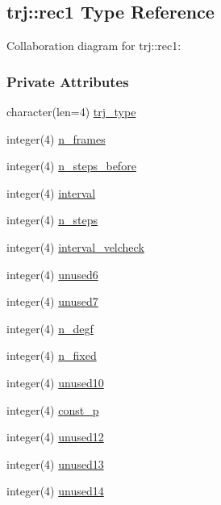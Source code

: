 \hypertarget{structtrj_1_1rec1}{\subsection{trj\-:\-:rec1 Type Reference}
\label{structtrj_1_1rec1}
}


Collaboration diagram for trj\-:\-:rec1\-:
\subsubsection*{Private Attributes}
\begin{DoxyCompactItemize}
\item 
character(len=4) \hyperlink{structtrj_1_1rec1_a862716d57b11724e2788f49a846f833f}{trj\-\_\-type}
\item 
integer(4) \hyperlink{structtrj_1_1rec1_a3cd09d77ed226e1ed2665dfb2e137c73}{n\-\_\-frames}
\item 
integer(4) \hyperlink{structtrj_1_1rec1_aeccf6f19e0a835924d5d927a35ac582d}{n\-\_\-steps\-\_\-before}
\item 
integer(4) \hyperlink{structtrj_1_1rec1_ae49a5622a7b1b8315421e211b128c6d2}{interval}
\item 
integer(4) \hyperlink{structtrj_1_1rec1_a2fb6023c1c0adbc2543bee4ed2fe222c}{n\-\_\-steps}
\item 
integer(4) \hyperlink{structtrj_1_1rec1_a7a30d4fb88f3441a72b45078915babe9}{interval\-\_\-velcheck}
\item 
integer(4) \hyperlink{structtrj_1_1rec1_af5ba3e012645bd707d9398686802ac7b}{unused6}
\item 
integer(4) \hyperlink{structtrj_1_1rec1_adad6f84db42ddc156c148af1592bf3cf}{unused7}
\item 
integer(4) \hyperlink{structtrj_1_1rec1_a51d2fd394bb6ad4aa5a9284f13f11353}{n\-\_\-degf}
\item 
integer(4) \hyperlink{structtrj_1_1rec1_ac4b10b0318da6a7f407818b9210ec1e6}{n\-\_\-fixed}
\item 
integer(4) \hyperlink{structtrj_1_1rec1_a92dc7f99bad1ea038585fd48d94b18cc}{unused10}
\item 
integer(4) \hyperlink{structtrj_1_1rec1_aff034e7e787ec026066401a2946f262d}{const\-\_\-p}
\item 
integer(4) \hyperlink{structtrj_1_1rec1_a6fc74ee7b1f9744b6fa040d7612ed24a}{unused12}
\item 
integer(4) \hyperlink{structtrj_1_1rec1_a8ba520f5ea09626baeb6931a6d336e7c}{unused13}
\item 
integer(4) \hyperlink{structtrj_1_1rec1_a5c15994550420e91df7c40d37bdb58d6}{unused14}

\end{DoxyCompactItemize}
